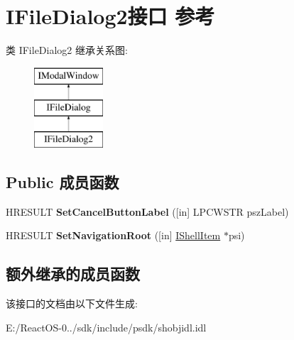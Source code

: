 \hypertarget{interface_i_file_dialog2}{}\section{I\+File\+Dialog2接口 参考}
\label{interface_i_file_dialog2}
类 I\+File\+Dialog2 继承关系图\+:\begin{figure}[H]
\begin{center}
\leavevmode
\includegraphics[height=3.000000cm]{interface_i_file_dialog2}
\end{center}
\end{figure}
\subsection*{Public 成员函数}
\begin{DoxyCompactItemize}
\item 
\mbox{\label{interface_i_file_dialog2_abf58edc7d4641b05f5b753fb6bf44853}} 
H\+R\+E\+S\+U\+LT {\bfseries Set\+Cancel\+Button\+Label} (\mbox{[}in\mbox{]} L\+P\+C\+W\+S\+TR psz\+Label)
\item 
\mbox{\label{interface_i_file_dialog2_a521fc4e92ca33f3900810d91877eb987}} 
H\+R\+E\+S\+U\+LT {\bfseries Set\+Navigation\+Root} (\mbox{[}in\mbox{]} \hyperlink{interface_i_shell_item}{I\+Shell\+Item} $\ast$psi)
\end{DoxyCompactItemize}
\subsection*{额外继承的成员函数}


该接口的文档由以下文件生成\+:\begin{DoxyCompactItemize}
\item 
E\+:/\+React\+O\+S-\/0../sdk/include/psdk/shobjidl.\+idl\end{DoxyCompactItemize}
